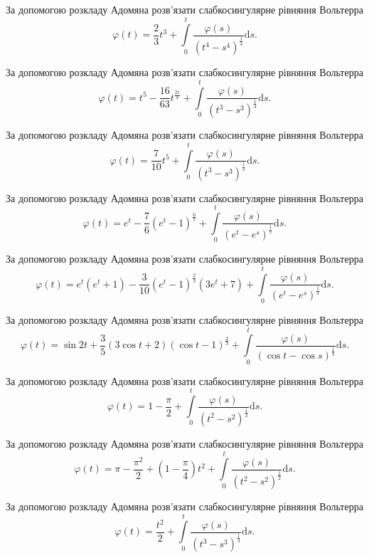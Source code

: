\documentclass[12pt]{extarticle}
\begin{document}
\begin{Exercise}
За допомогою розкладу Адомяна розв’язати слабкосингулярне рівняння Вольтерра \[\varphi(t) = \dfrac{2}{3} t^3 + \int\limits_{0}^{t} \dfrac{\varphi(s)}{(t^4 - s^4)^\frac{1}{4}} \mathrm{d}s.\]
\end{Exercise}

\begin{Exercise}
За допомогою розкладу Адомяна розв’язати слабкосингулярне рівняння Вольтерра \[\varphi(t) = t^5 - \dfrac{16}{63}t^{\frac{21}{4}} + \int\limits_{0}^{t} \dfrac{\varphi(s)}{(t^3 - s^3)^\frac{1}{4}} \mathrm{d}s.\]
\end{Exercise}

\begin{Exercise}
За допомогою розкладу Адомяна розв’язати слабкосингулярне рівняння Вольтерра \[\varphi(t) = \dfrac{7}{10}t^5 + \int\limits_{0}^{t} \dfrac{\varphi(s)}{(t^3 - s^3)^\frac{1}{3}} \mathrm{d}s.\]
\end{Exercise}

\begin{Exercise}
За допомогою розкладу Адомяна розв’язати слабкосингулярне рівняння Вольтерра \[\varphi(t) = e^t - \dfrac{7}{6}\left(e^t - 1\right)^\frac{6}{7} + \int\limits_{0}^{t} \dfrac{\varphi(s)}{\left(e^t - e^s\right)^\frac{1}{7}} \mathrm{d}s.\]
\end{Exercise}

\begin{Exercise}
За допомогою розкладу Адомяна розв’язати слабкосингулярне рівняння Вольтерра \[\varphi(t) = e^t (e^t+1) - \dfrac{3}{10}\left(e^t - 1\right)^\frac{2}{3}(3e^t+7) + \int\limits_{0}^{t} \dfrac{\varphi(s)}{\left(e^t - e^s\right)^\frac{1}{3}} \mathrm{d}s.\]
\end{Exercise}

\begin{Exercise}
За допомогою розкладу Адомяна розв’язати слабкосингулярне рівняння Вольтерра \[\varphi(t) = \sin 2t + \dfrac{3}{5}\left(3 \cos t + 2\right)(\cos t - 1)^\frac{2}{3} + \int\limits_{0}^{t} \dfrac{\varphi(s)}{\left(\cos t - \cos s\right)^\frac{1}{3}} \mathrm{d}s.\]
\end{Exercise}

\begin{Exercise}
За допомогою розкладу Адомяна розв’язати слабкосингулярне рівняння Вольтерра \[\varphi(t) = 1 - \dfrac{\pi}{2} + \int\limits_{0}^{t} \dfrac{\varphi(s)}{\left(t^2 - s^2\right)^\frac{1}{2}} \mathrm{d}s.\]
\end{Exercise}

\begin{Exercise}
За допомогою розкладу Адомяна розв’язати слабкосингулярне рівняння Вольтерра \[\varphi(t) = \pi - \dfrac{\pi^2}{2} + \left(1-\dfrac{\pi}{4}\right) t^2 + \int\limits_{0}^{t} \dfrac{\varphi(s)}{\left(t^2 - s^2\right)^\frac{1}{2}} \mathrm{d}s.\]
\end{Exercise}

\begin{Exercise}
За допомогою розкладу Адомяна розв’язати слабкосингулярне рівняння Вольтерра \[\varphi(t) = \dfrac{t^2}{2} + \int\limits_{0}^{t} \dfrac{\varphi(s)}{\left(t^3 - s^3\right)^\frac{1}{3}} \mathrm{d}s.\]
\end{Exercise}
\end{document}
